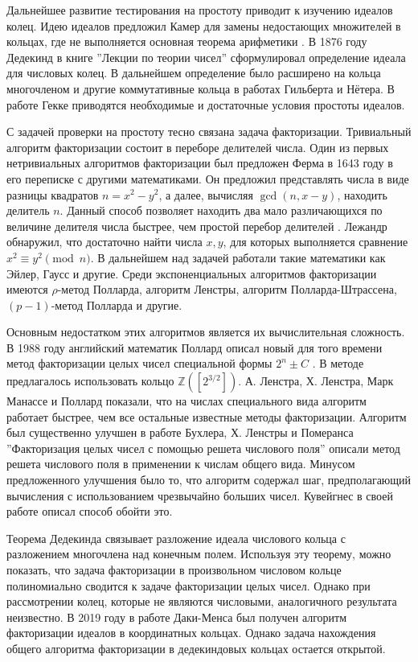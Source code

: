 \documentclass[_00_dissertation.tex]{subfiles}
\begin{document}
Дальнейшее развитие тестирования на простоту приводит к изучению идеалов колец.
Идею идеалов предложил Камер для замены недостающих множителей в кольцах, где не выполняется основная теорема арифметики \cite{Stillwell}.
В 1876 году Дедекинд в книге ''Лекции по теории чисел''\cite{Dedekind} сформулировал определение идеала для числовых колец.
В дальнейшем определение было расширено на кольца многочленом и другие коммутативные кольца в работах Гильберта и Нётера.
В работе Гекке \cite{Gekke} приводятся необходимые и достаточные условия простоты идеалов.

С задачей проверки на простоту тесно связана задача факторизации.
Тривиальный алгоритм факторизации состоит в переборе делителей числа.
Один из первых нетривиальных алгоритмов факторизации был предложен Ферма в 1643 году в его переписке с другими математиками.
Он предложил представлять числа в виде разницы квадратов $n = x^2 - y^2$, а далее, вычисляя $\gcd(n,x-y)$, находить делитель $n$.
Данный способ позволяет находить два мало различающихся по величине делителя числа быстрее, чем простой перебор делителей \cite{Yaschenko}.
Лежандр обнаружил, что достаточно найти числа $x, y$, для которых выполняется сравнение $x^{2}\equiv y^{2}\pmod{n}$.
В дальнейшем над задачей работали такие математики как Эйлер, Гаусс и другие.
Среди экспоненциальных алгоритмов факторизации имеются $\rho$-метод Полларда, алгоритм Ленстры, алгоритм Полларда-Штрассена, $(p-1)$-метод Полларда и другие.

Основным недостатком этих алгоритмов является их вычислительная сложность.
В 1988 году английский математик Поллард описал новый для того времени метод факторизации целых чисел специальной формы $2^n \pm C$ \cite{Pollard}.
В методе предлагалось использовать кольцо $\mathbb{Z}([2^{3/2}])$.
А. Ленстра, Х. Ленстра, Марк Манассе и Поллард показали, что на числах специального вида алгоритм работает быстрее, чем все остальные известные методы факторизации.
Алгоритм был существенно улучшен в работе Бухлера, Х. Ленстры и Померанса ''Факторизация целых чисел с помощью решета числового поля'' \cite{Buhler} описали метод решета числового поля в применении к числам общего вида.
Минусом предложенного улучшения было то, что алгоритм содержал шаг, предполагающий вычисления с использованием чрезвычайно больших чисел.
Кувейгнес в своей работе \cite{Couveignes} описал способ обойти это.

Теорема Дедекинда связывает разложение идеала числового кольца с разложением многочлена над конечным полем.
Используя эту теорему, можно показать, что задача факторизации в произвольном числовом кольце полиномиально сводится к задаче факторизации целых чисел.
Однако при рассмотрении колец, которые не являются числовыми, аналогичного результата неизвестно.
В 2019 году в работе Даки-Менса \cite{Darkey-Mensah} был получен алгоритм факторизации идеалов в координатных кольцах.
Однако задача нахождения общего алгоритма факторизации в дедекиндовых кольцах остается открытой.
\end{document}
